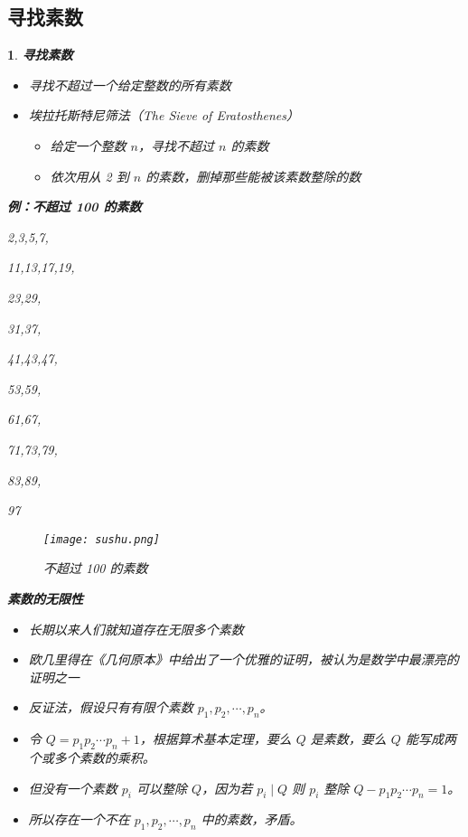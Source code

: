 \documentclass[UTF8]{report}
\theoremstyle{MyLineTheoremStyle} %
\theoremstyle{MyBlockTheoremStyle} %
\theoremstyle{MySubsubsectionStyle} %
\newtheorem{definition}{}
\begin{document}
\subsection{寻找素数}

\begin{definition}
    \textbf{寻找素数}
    \begin{itemize}
        \item 寻找不超过一个给定整数的所有素数
        \item 埃拉托斯特尼筛法（The Sieve of Eratosthenes）
        \begin{itemize}
            \item 给定一个整数 $n$，寻找不超过 $n$ 的素数
            \item 依次用从 2 到 $n$ 的素数，删掉那些能被该素数整除的数
        \end{itemize}
    \end{itemize}

    \textbf{例：不超过 100 的素数}\par
2,3,5,7,\par
11,13,17,19,\par
23,29,\par
31,37,\par
41,43,47,\par
53,59,\par
61,67,\par
71,73,79,\par
83,89,\par
97
    \begin{figure}[ht]
        \centering
        \texttt{[image: sushu.png]}
        \caption{不超过 100 的素数}
    \end{figure}
\cleardoublepage
    \textbf{素数的无限性}
    \begin{itemize}
        \item 长期以来人们就知道存在无限多个素数
        \item 欧几里得在《几何原本》中给出了一个优雅的证明，被认为是数学中最漂亮的证明之一
        \item 反证法，假设只有有限个素数 $p_1, p_2, \cdots, p_n$。
        \item 令 $Q = p_1p_2 \cdots p_n + 1$，根据算术基本定理，要么 $Q$ 是素数，要么 $Q$ 能写成两个或多个素数的乘积。
        \item 但没有一个素数 $p_i$ 可以整除 $Q$，因为若 $p_i \mid Q$ 则 $p_i$ 整除 $Q - p_1p_2 \cdots p_n = 1$。
        \item 所以存在一个不在 $p_1, p_2, \cdots, p_n$ 中的素数，矛盾。
    \end{itemize}
\end{definition}
\end{document}
